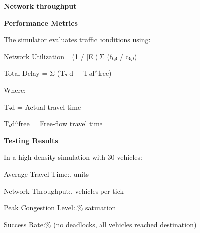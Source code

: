 {\bfseries{Network throughput}}

{\bfseries{Performance Metrics}}

The simulator evaluates traffic conditions using:\+

Network Utilization= (1 /\+ \texorpdfstring{$\vert$}{|}\+E\texorpdfstring{$\vert$}{|}) Σ (f₍ᵢⱼ₎ /\+ c₍ᵢⱼ₎)

Total Delay = Σ (Tₛ d − Tₛd\texorpdfstring{$^\wedge$}{\string^}free)

Where:\+

Tₛd = Actual travel time

Tₛd\texorpdfstring{$^\wedge$}{\string^}free = Free-\/flow travel time

{\bfseries{Testing Results}}

In a high-\/density simulation with 30 vehicles:\+


\begin{DoxyItemize}
\item Average Travel Time:. units
\item Network Throughput:. vehicles per tick
\item Peak Congestion Level:.\% saturation
\item Success Rate:\% (no deadlocks, all vehicles reached destination) 
\end{DoxyItemize}